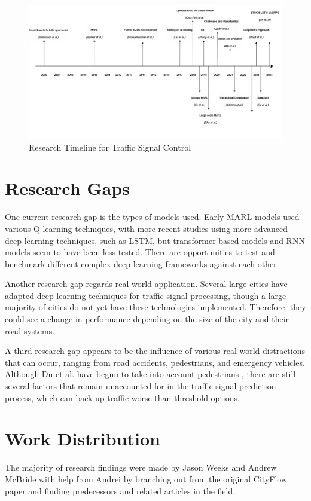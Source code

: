 \documentclass[conference]{IEEEtran}
\begin{document}
\begin{figure}[H]
    \centering
    \includegraphics[width=0.9\linewidth]{Diagram Timeline.png}
    \caption{Research Timeline for Traffic Signal Control}
\end{figure}

\section{Research Gaps}
One current research gap is the types of models used. Early MARL models used various Q-learning techniques, with more recent studies using more advanced deep learning techniques, such as LSTM, but transformer-based models and RNN models seem to have been less tested. There are opportunities to test and benchmark different complex deep learning frameworks against each other. 

Another research gap regards real-world application. Several large cities have adapted deep learning techniques for traffic signal processing, though a large majority of cities do not yet have these technologies implemented. Therefore, they could see a change in performance depending on the size of the city and their road systems. 

A third research gap appears to be the influence of various real-world distractions that can occur, ranging from road accidents, pedestrians, and emergency vehicles. Although Du et al. have begun to take into account pedestrians \cite{13}, there are still several factors that remain unaccounted for in the traffic signal prediction process, which can back up traffic worse than threshold options.

\section*{Work Distribution}
The majority of research findings were made by Jason Weeks and Andrew McBride with help from Andrei by branching out from the original CityFlow paper \cite{7} and finding predecessors and related articles in the field. 
\end{document}
